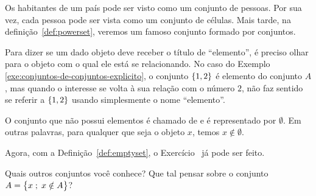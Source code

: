 \begin{example}
\label{exe:conjuntos-de-conjuntos-implicito}
Os habitantes de um país pode ser visto como um conjunto de pessoas.
Por sua vez, cada pessoa pode ser vista como um conjunto de células.
Mais tarde, na definição~\ref{def:powerset}, veremos um famoso conjunto formado por conjuntos.
\end{example}


Para dizer se um dado objeto deve receber o título de ``elemento'', é preciso olhar para o objeto com o qual ele está se relacionando. 
No caso do Exemplo \ref{exe:conjuntos-de-conjuntos-explicito}, o conjunto $\left\{ 1,2\right\}$ é elemento do conjunto $A$, mas quando o interesse se volta à sua relação com o número $2$, não faz sentido se referir a $\left\{ 1,2\right\}$ usando simplesmente o nome ``elemento''.

\begin{definition}
\label{def:emptyset}
O conjunto que não possui elementos é chamado de  e é representado por $\emptyset$.
Em outras palavras, para qualquer que seja o objeto $x$, temos $x \notin \emptyset$.
\end{definition}

Agora, com a Definição~\ref{def:emptyset}, o Exercício~ já pode ser feito.

\begin{example}
Quais outros conjuntos você conhece? Que tal pensar sobre o conjunto $A = \left\{ x \;;\; x \notin A\right\}$?
\end{example}

